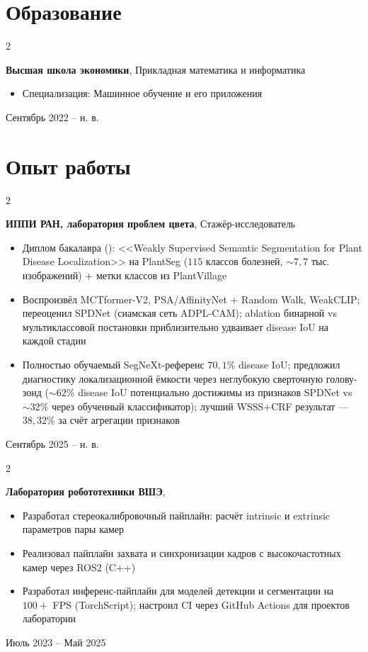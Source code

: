 \documentclass[a4paper,10pt]{article}
\newenvironment{highlights}{
    \begin{itemize}[
        topsep=0.10 cm,
        parsep=0.10 cm,
        partopsep=0pt,
        itemsep=0pt,
        leftmargin=0.4 cm + 10pt
    ]
}{
    \end{itemize}
} %
\newenvironment{twocolentry}[2][]{
    \onecolentry
    \def\secondColumn{#2}
    \setcolumnwidth{\fill, 4.5 cm}
    \begin{paracol}{2}
}{
    \switchcolumn \raggedleft \secondColumn
    \end{paracol}
    \endonecolentry
} %
\let\hrefWithoutArrow\href
\renewcommand{\href}[2]{\hrefWithoutArrow{#1}{\ifthenelse{\equal{#2}{}}{ }{#2 }\raisebox{.15ex}{\footnotesize \faExternalLink*}}}
\begin{document}
\section{Образование}
    \begin{twocolentry}{Сентябрь 2022 – н. в.}
        \textbf{Высшая школа экономики}, Прикладная математика и информатика
        \begin{highlights}
            \item Специализация: Машинное обучение и его приложения
        \end{highlights}
    \end{twocolentry}

\section{Опыт работы}
    \begin{twocolentry}{Сентябрь 2025 – н. в.}
        \textbf{ИППИ РАН, лаборатория проблем цвета}, {Стажёр-исследователь}
        \begin{highlights}
            \item Диплом бакалавра (\href{https://drive.google.com/file/d/1HIbjC7hjCQFUHzg0833LVJMyNz3ahcst/view?usp=sharing}{PDF}): <<Weakly Supervised Semantic Segmentation for Plant Disease Localization>> на PlantSeg ($115$ классов болезней, ${\sim}7{,}7$ тыс. изображений) + метки классов из PlantVillage
            \item Воспроизвёл MCTformer-V2, PSA/AffinityNet + Random Walk, WeakCLIP; переоценил SPDNet (сиамская сеть ADPL-CAM); ablation бинарной vs мультиклассовой постановки приблизительно удваивает disease IoU на каждой стадии
            \item Полностью обучаемый SegNeXt-референс $70{,}1\%$ disease IoU; предложил диагностику локализационной ёмкости через неглубокую сверточную голову-зонд (${\sim}62\%$ disease IoU потенциально достижимы из признаков SPDNet vs ${\sim}32\%$ через обученный классификатор); лучший WSSS+CRF результат --- $38{,}32\%$ за счёт агрегации признаков
        \end{highlights}
    \end{twocolentry}
    \begin{twocolentry}{Июль 2023 – Май 2025}
        \textbf{Лаборатория робототехники ВШЭ}, \href{https://cs.hse.ru/robotics/persons1}{Студент}
        \begin{highlights}
            \item Разработал стереокалибровочный пайплайн: расчёт intrinsic и extrinsic параметров пары камер
            \item Реализовал пайплайн захвата и синхронизации кадров с высокочастотных камер через ROS2 (C++)
            \item Разработал инференс-пайплайн для моделей детекции и сегментации на $100\!+$ FPS (TorchScript); настроил CI через GitHub Actions для проектов лаборатории
        \end{highlights}
    \end{twocolentry}
\end{document}
